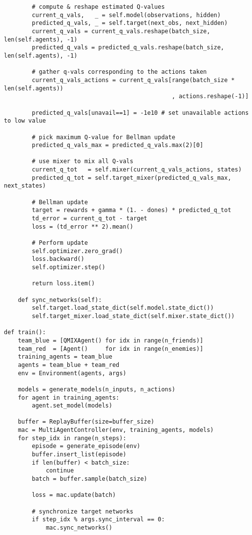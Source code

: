 \begin{appendices}
\begin{verbatim}
        # compute & reshape estimated Q-values
        current_q_vals,   _ = self.model(observations, hidden)
        predicted_q_vals, _ = self.target(next_obs, next_hidden)
        current_q_vals = current_q_vals.reshape(batch_size, len(self.agents), -1)
        predicted_q_vals = predicted_q_vals.reshape(batch_size, len(self.agents), -1)

        # gather q-vals corresponding to the actions taken
        current_q_vals_actions = current_q_vals[range(batch_size * len(self.agents))
                                                , actions.reshape(-1)]

        predicted_q_vals[unavail==1] = -1e10 # set unavailable actions to low value
        
        # pick maximum Q-value for Bellman update
        predicted_q_vals_max = predicted_q_vals.max(2)[0]
        
        # use mixer to mix all Q-vals
        current_q_tot   = self.mixer(current_q_vals_actions, states)
        predicted_q_tot = self.target_mixer(predicted_q_vals_max, next_states)
        
        # Bellman update
        target = rewards + gamma * (1. - dones) * predicted_q_tot
        td_error = current_q_tot - target
        loss = (td_error ** 2).mean()

        # Perform update
        self.optimizer.zero_grad()
        loss.backward()
        self.optimizer.step()

        return loss.item()
    
    def sync_networks(self):
        self.target.load_state_dict(self.model.state_dict())
        self.target_mixer.load_state_dict(self.mixer.state_dict())
        
def train():
    team_blue = [QMIXAgent() for idx in range(n_friends)] 
    team_red  = [Agent()     for idx in range(n_enemies)] 
    training_agents = team_blue
    agents = team_blue + team_red
    env = Environment(agents, args)

    models = generate_models(n_inputs, n_actions)
    for agent in training_agents:
        agent.set_model(models)

    buffer = ReplayBuffer(size=buffer_size)
    mac = MultiAgentController(env, training_agents, models)
    for step_idx in range(n_steps):
        episode = generate_episode(env)
        buffer.insert_list(episode)
        if len(buffer) < batch_size:
            continue
        batch = buffer.sample(batch_size)
        
        loss = mac.update(batch)
        
        # synchronize target networks 
        if step_idx % args.sync_interval == 0:
            mac.sync_networks()
\end{verbatim}

\end{appendices}


